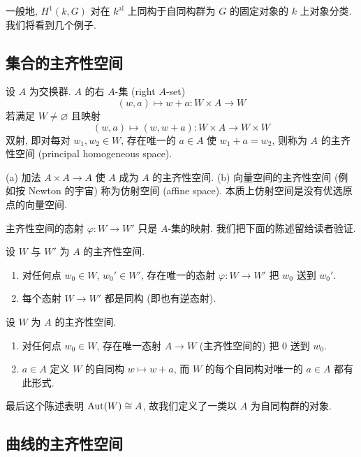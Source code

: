 一般地, $H^1(k, G)$ 对在 $k^{\mathrm{al}}$ 上同构于自同构群为 $G$ 的固定对象的 $k$ 上对象分类. 我们将看到几个例子.

\subsection*{集合的主齐性空间}

设 $A$ 为交换群. $A$ 的右 $A$-集 (right $A$-set)
\[
(w, a)\mapsto w + a\colon W\times A\to W
\]
若满足 $W\neq\varnothing$ 且映射
\[
(w, a)\mapsto(w, w+a)\colon W\times A\to W\times W
\]
双射, 即对每对 $w_1, w_2\in W$, 存在唯一的 $a\in A$ 使 $w_1 + a = w_2$, 则称为 $A$ 的主齐性空间 (principal homogeneous space).

\begin{example} \label{thm:4.7.1} 
(a) 加法 $A\times A\to A$ 使 $A$ 成为 $A$ 的主齐性空间.
(b) 向量空间的主齐性空间 (例如按 Newton 的宇宙) 称为仿射空间 (affine space). 本质上仿射空间是没有优选原点的向量空间.
\end{example}

主齐性空间的态射 $\varphi\colon W\to W'$ 只是 $A$-集的映射. 我们把下面的陈述留给读者验证.

\begin{aside} \label{thm:4.7.2} 
设 $W$ 与 $W'$ 为 $A$ 的主齐性空间.
\begin{enumerate}[label=\textup{(\alph*)}]
\item 对任何点 $w_0\in W$, $w_0'\in W'$, 存在唯一的态射 $\varphi\colon W\to W'$ 把 $w_0$ 送到 $w_0'$.
\item 每个态射 $W\to W'$ 都是同构 (即也有逆态射).
\end{enumerate}
\end{aside}

\begin{aside} \label{thm:4.7.3} 
设 $W$ 为 $A$ 的主齐性空间.
\begin{enumerate}[label=\textup{(\alph*)}]
\item 对任何点 $w_0\in W$, 存在唯一态射 $A\to W$ (主齐性空间的) 把 $0$ 送到 $w_0$.
\item $a\in A$ 定义 $W$ 的自同构 $w\mapsto w + a$, 而 $W$ 的每个自同构对唯一的 $a\in A$ 都有此形式.
\end{enumerate}
最后这个陈述表明 $\operatorname{Aut}(W)\cong A$, 故我们定义了一类以 $A$ 为自同构群的对象.
\end{aside}

\subsection*{曲线的主齐性空间}

